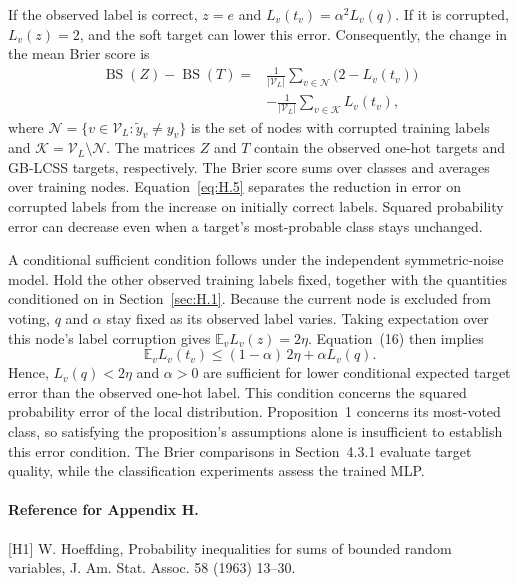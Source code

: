If the observed label is correct, \(z=e\) and \(L_v(t_v)=\alpha^2L_v(q)\). If it is corrupted, \(L_v(z)=2\), and the soft target can lower this error. Consequently, the change in the mean Brier score is
\begin{equation}\label{eq:H.5}
\begin{aligned}
\operatorname{BS}(Z)-\operatorname{BS}(T)={}&
\frac{1}{|\mathcal{V}_L|}\sum_{v\in\mathcal{N}}\bigl(2-L_v(t_v)\bigr)\\
&-\frac{1}{|\mathcal{V}_L|}\sum_{v\in\mathcal{K}}L_v(t_v),
\end{aligned}
\end{equation}
where \(\mathcal{N}=\{v\in\mathcal{V}_L:\widetilde y_v\ne y_v\}\) is the set of nodes with corrupted training labels and \(\mathcal{K}=\mathcal{V}_L\setminus\mathcal{N}\). The matrices \(Z\) and \(T\) contain the observed one-hot targets and GB-LCSS targets, respectively. The Brier score sums over classes and averages over training nodes. Equation~\eqref{eq:H.5} separates the reduction in error on corrupted labels from the increase on initially correct labels. Squared probability error can decrease even when a target's most-probable class stays unchanged.

A conditional sufficient condition follows under the independent symmetric-noise model. Hold the other observed training labels fixed, together with the quantities conditioned on in Section~\ref{sec:H.1}. Because the current node is excluded from voting, \(q\) and \(\alpha\) stay fixed as its observed label varies. Taking expectation over this node's label corruption gives \(\mathbb{E}_v L_v(z)=2\eta\). Equation~(16) then implies
\begin{equation}\label{eq:H.6}
\mathbb{E}_v L_v(t_v)\leq(1-\alpha)\,2\eta+\alpha L_v(q).
\end{equation}
Hence, \(L_v(q)<2\eta\) and \(\alpha>0\) are sufficient for lower conditional expected target error than the observed one-hot label. This condition concerns the squared probability error of the local distribution. Proposition~1 concerns its most-voted class, so satisfying the proposition's assumptions alone is insufficient to establish this error condition. The Brier comparisons in Section~4.3.1 evaluate target quality, while the classification experiments assess the trained MLP.

\paragraph{Reference for Appendix H.}
[H1] W. Hoeffding, Probability inequalities for sums of bounded random variables, J. Am. Stat. Assoc. 58 (1963) 13--30.

